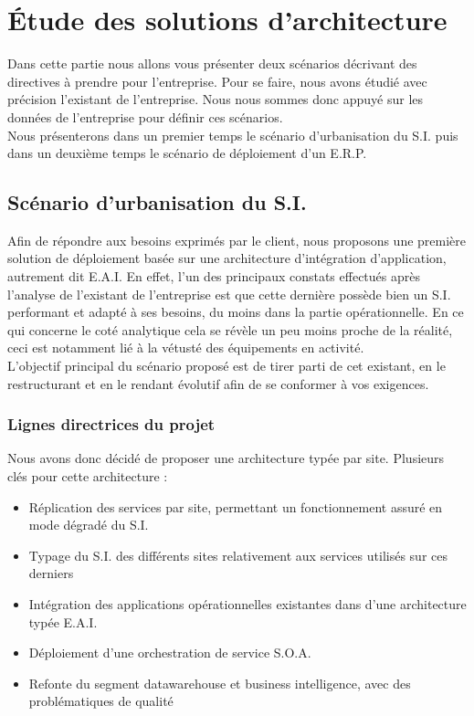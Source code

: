 \section{Étude des solutions d'architecture}

Dans cette partie nous allons vous présenter deux scénarios décrivant des directives à prendre pour l'entreprise. Pour se faire, nous avons étudié avec précision l'existant de l'entreprise. Nous nous sommes donc appuyé sur les données de l'entreprise pour définir ces scénarios. \\
Nous présenterons dans un premier temps le scénario d'urbanisation du S.I. puis dans un deuxième temps le scénario de déploiement d'un E.R.P.

\subsection{Scénario d'urbanisation du S.I.}

Afin de répondre aux besoins exprimés par le client, nous proposons une première solution de déploiement basée sur une architecture d'intégration d'application, autrement dit E.A.I. 
En effet, l'un des principaux constats effectués après l'analyse de l'existant de l'entreprise est que cette dernière possède bien un S.I. performant et adapté à ses besoins, du moins dans la partie opérationnelle. En ce qui concerne le coté analytique cela se révèle un peu moins proche de la réalité, ceci est notamment lié à la vétusté des équipements en activité.\\ 
L'objectif principal du scénario proposé est de tirer parti de cet existant, en le restructurant et en le rendant évolutif afin de se conformer à vos exigences.

\subsubsection{Lignes directrices du projet}

Nous avons donc décidé de proposer une architecture typée par site. Plusieurs clés pour cette architecture :\\

\begin{itemize}
\item Réplication des services par site, permettant un fonctionnement assuré en mode dégradé du S.I.
\item Typage du S.I. des différents sites relativement aux services utilisés sur ces derniers
\item Intégration des applications opérationnelles existantes dans d'une architecture typée E.A.I.
\item Déploiement d'une orchestration de service S.O.A.
\item Refonte du segment datawarehouse et business intelligence, avec des problématiques de qualité\\
\end{itemize}

